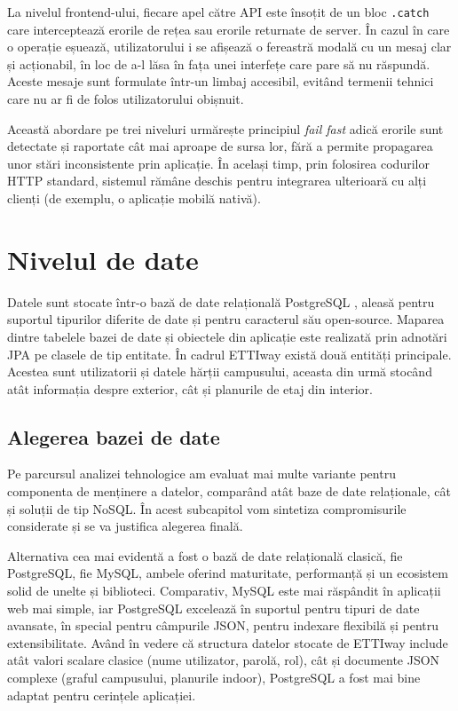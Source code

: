 La nivelul frontend-ului, fiecare apel către API este însoțit de un bloc
\texttt{.catch} care interceptează erorile de rețea sau erorile returnate de
server. În cazul în care o operație eșuează, utilizatorului i se afișează o
fereastră modală cu un mesaj clar și acționabil, în loc de a-l lăsa în fața
unei interfețe care pare să nu răspundă. Aceste mesaje sunt formulate într-un
limbaj accesibil, evitând termenii tehnici care nu ar fi de folos
utilizatorului obișnuit.
 
Această abordare pe trei niveluri urmărește principiul \textit{fail fast} adică
erorile sunt detectate și raportate cât mai aproape de sursa lor, fără a
permite propagarea unor stări inconsistente prin aplicație. În același timp,
prin folosirea codurilor HTTP standard, sistemul rămâne deschis pentru
integrarea ulterioară cu alți clienți (de exemplu, o aplicație mobilă nativă).

\section{Nivelul de date}
\label{sec:date}

Datele sunt stocate într-o bază de date relațională PostgreSQL
\cite{PostgreSQL}, aleasă pentru suportul tipurilor diferite de date și pentru caracterul său open-source. Maparea dintre tabelele
bazei de date și obiectele din aplicație este realizată prin adnotări JPA pe
clasele de tip entitate. În cadrul ETTIway există două entități principale. Acestea sunt
utilizatorii și datele hărții campusului, aceasta din urmă stocând atât
informația despre exterior, cât și planurile de etaj din interior.


\subsection{Alegerea bazei de date}
\label{subsec:alegere-db}
 
Pe parcursul analizei tehnologice am evaluat mai multe variante pentru
componenta de menținere a datelor, comparând atât baze de date relaționale,
cât și soluții de tip NoSQL. În acest subcapitol vom sintetiza compromisurile
considerate și se va justifica alegerea finală.
 
Alternativa cea mai evidentă a fost o bază de date relațională clasică, fie
PostgreSQL, fie MySQL, ambele oferind maturitate, performanță și un ecosistem
solid de unelte și biblioteci. Comparativ, MySQL este mai răspândit în
aplicații web mai simple, iar PostgreSQL excelează în suportul pentru tipuri
de date avansate, în special pentru câmpurile JSON, pentru indexare flexibilă
și pentru extensibilitate. Având în vedere că structura datelor stocate de
ETTIway include atât valori scalare clasice (nume utilizator, parolă, rol),
cât și documente JSON complexe (graful campusului, planurile indoor),
PostgreSQL a fost mai bine adaptat pentru cerințele aplicației.
 
